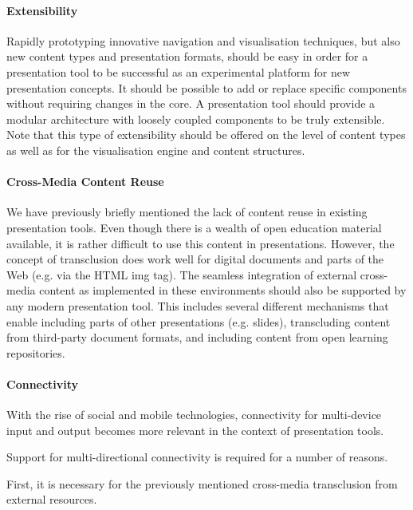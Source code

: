      \paragraph{Extensibility} Rapidly prototyping innovative navigation and
      visualisation techniques, but also new content types and presentation
      formats, should be easy in order for a presentation tool to be successful
      as an experimental platform for new presentation concepts. It should be
      possible to add or replace specific components without requiring changes
      in the core. A presentation tool should provide a modular architecture
      with loosely coupled components to be truly extensible. Note that this
      type of extensibility should be offered on the level of content types as
      well as for the visualisation engine and content structures.

     \paragraph{Cross-Media Content Reuse} We have previously briefly mentioned
      the lack of content reuse in existing presentation tools. Even though
      there is a wealth of open education material available, it is rather
      difficult to use this content in presentations. However, the concept of
      transclusion does work well for digital documents and parts of the Web
      (e.g. via the HTML img tag). The seamless integration of external
      cross-media content as implemented in these environments should also be
      supported by any modern presentation tool. This includes several
      different mechanisms that enable including parts of other presentations
      (e.g. slides), transcluding content from third-party document formats,
      and including content from open learning repositories.


     \paragraph{Connectivity}
     
      With the rise of social and mobile technologies,
      connectivity for multi-device input and output becomes more relevant in
      the context of presentation tools.
     
      Support for multi-directional
      connectivity is required for a number of reasons.
     
      First, it is necessary
      for the previously mentioned cross-media transclusion from external
      resources.
     

